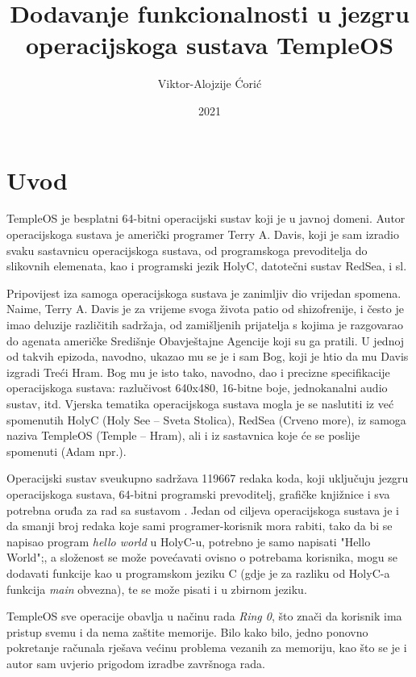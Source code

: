 \documentclass{foi}
\title{Dodavanje funkcionalnosti u jezgru operacijskoga sustava TempleOS}
\author{Viktor-Alojzije Ćorić}
\date{2021}
\begin{document}
\maketitle

\tableofcontents

\pagestyle{plain}
\chapter{Uvod}

TempleOS je besplatni 64-bitni operacijski sustav koji je u javnoj domeni. Autor operacijskoga sustava je američki programer Terry A. Davis, koji je sam izradio svaku sastavnicu operacijskoga sustava, od programskoga prevoditelja do slikovnih elemenata, kao i programski jezik HolyC, datotečni sustav RedSea, i sl.

Pripovijest iza samoga operacijskoga sustava je zanimljiv dio vrijedan spomena. Naime, Terry A. Davis je za vrijeme svoga života patio od shizofrenije, i često je imao deluzije različitih sadržaja, od zamišljenih prijatelja s kojima je razgovarao do agenata američke Središnje Obavještajne Agencije koji su ga pratili. U jednoj od takvih epizoda, navodno, ukazao mu se je i sam Bog, koji je htio da mu Davis izgradi Treći Hram. Bog mu je isto tako, navodno, dao i precizne specifikacije operacijskoga sustava: razlučivost 640x480, 16-bitne boje, jednokanalni audio sustav, itd. Vjerska tematika operacijskoga sustava mogla je se naslutiti iz već spomenutih HolyC (Holy See – Sveta Stolica), RedSea (Crveno more), iz samoga naziva TempleOS (Temple – Hram), ali i iz sastavnica koje će se poslije spomenuti (Adam npr.).

Operacijski sustav sveukupno sadržava 119667 redaka koda, koji uključuju jezgru operacijskoga sustava, 64-bitni programski prevoditelj, grafičke knjižnice i sva potrebna oruđa za rad sa sustavom \cite{TOS}. Jedan od ciljeva operacijskoga sustava je i da smanji broj redaka koje sami programer-korisnik mora rabiti, tako da bi se napisao program \emph{hello world} u HolyC-u, potrebno je samo napisati {\selectfont "Hello World";}, a složenost se može povećavati ovisno o potrebama korisnika, mogu se dodavati funkcije kao u programskom jeziku C (gdje je za razliku od HolyC-a funkcija \emph{main} obvezna), te se može pisati i u zbirnom jeziku.

TempleOS sve operacije obavlja u načinu rada \emph{Ring 0}, što znači da korisnik ima pristup svemu i da nema zaštite memorije. Bilo kako bilo, jedno ponovno pokretanje računala rješava većinu problema vezanih za memoriju, kao što se je i autor sam uvjerio prigodom izradbe završnoga rada.
\end{document}
